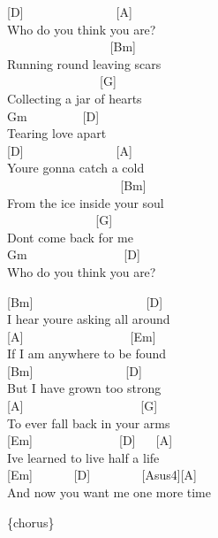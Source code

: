 \documentclass[
  letterpaper,
  twoside=false]{scrbook}
\begin{document}
{[}D{]} ~ ~ ~ ~ ~ ~ ~ ~ ~{[}A{]}\\
Who do you think you are?\\
\hspace*{0.333em} ~ ~ ~ ~ ~ ~ ~ ~ ~ ~ {[}Bm{]}\\
Running \textquotesingle round leaving scars\\
\hspace*{0.333em} ~ ~ ~ ~ ~ ~ ~ ~ ~ {[}G{]}\\
Collecting a jar of hearts\\
Gm ~ ~ ~ ~ ~ {[}D{]}\\
Tearing love apart\\
{[}D{]} ~ ~ ~ ~ ~ ~ ~ ~ ~{[}A{]}\\
You\textquotesingle re gonna catch a cold\\
\hspace*{0.333em} ~ ~ ~ ~ ~ ~ ~ ~ ~ ~ ~ {[}Bm{]}\\
From the ice inside your soul\\
\hspace*{0.333em} ~ ~ ~ ~ ~ ~ ~ ~ ~{[}G{]}\\
Don\textquotesingle t come back for me\\
Gm ~ ~ ~ ~ ~ ~ ~ ~ ~ {[}D{]}\\
Who do you think you are?

{[}Bm{]} ~ ~ ~ ~ ~ ~ ~ ~ ~ ~ ~{[}D{]}\\
I hear you\textquotesingle re asking all around\\
{[}A{]} ~ ~ ~ ~ ~ ~ ~ ~ ~ ~ {[}Em{]}\\
If I am anywhere to be found\\
{[}Bm{]} ~ ~ ~ ~ ~ ~ ~ ~ ~{[}D{]}\\
But I have grown too strong\\
{[}A{]} ~ ~ ~ ~ ~ ~ ~ ~ ~ ~ ~ {[}G{]}\\
To ever fall back in your arms\\
{[}Em{]} ~ ~ ~ ~ ~ ~ ~ ~ {[}D{]} ~ ~{[}A{]}\\
I\textquotesingle ve learned to live half a life\\
{[}Em{]} ~ ~ ~ ~{[}D{]} ~ ~ ~ ~ ~{[}Asus4{]}{[}A{]}\\
And now you want me one more time

\{chorus\}
\end{document}
